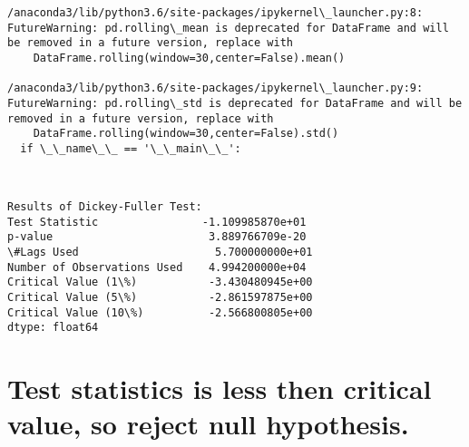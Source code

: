 \documentclass[11pt]{article}
\begin{document}
    \begin{Verbatim}[commandchars=\\\{\}]
/anaconda3/lib/python3.6/site-packages/ipykernel\_launcher.py:8: FutureWarning: pd.rolling\_mean is deprecated for DataFrame and will be removed in a future version, replace with 
	DataFrame.rolling(window=30,center=False).mean()
  
/anaconda3/lib/python3.6/site-packages/ipykernel\_launcher.py:9: FutureWarning: pd.rolling\_std is deprecated for DataFrame and will be removed in a future version, replace with 
	DataFrame.rolling(window=30,center=False).std()
  if \_\_name\_\_ == '\_\_main\_\_':

    \end{Verbatim}

    \begin{center}
    \end{center}
    { \hspace*{\fill} \\}
    
    \begin{Verbatim}[commandchars=\\\{\}]
Results of Dickey-Fuller Test:
Test Statistic                -1.109985870e+01
p-value                        3.889766709e-20
\#Lags Used                     5.700000000e+01
Number of Observations Used    4.994200000e+04
Critical Value (1\%)           -3.430480945e+00
Critical Value (5\%)           -2.861597875e+00
Critical Value (10\%)          -2.566800805e+00
dtype: float64

    \end{Verbatim}

    \section{Test statistics is less then critical value, so reject null
hypothesis.}\label{test-statistics-is-less-then-critical-value-so-reject-null-hypothesis.}
\end{document}
